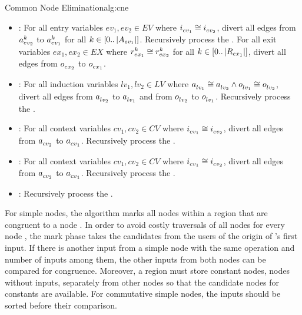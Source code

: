 \begin{informalg}{Common Node Elimination}{alg:cne}
\begin{enumerate}
\begin{itemize}
			\item \bpoint{\gammanode}: For all entry variables $ev_1, ev_2 \in EV$ where
				$\iput{}{ev_1} \cong \iput{}{ev_2}$, divert all edges from $\argument{k}{ev_2}$ to
				$\argument{k}{ev_1}$ for all $k \in [0..\card{A_{ev_1}}]$. Recursively
				process the \gammaregions. For all exit variables $ex_1, ex_2 \in EX$ where
				$\result{k}{ex_1} \cong \result{k}{ex_2}$ for all $k \in [0..\card{R_{ex_1}}]$, divert all
				edges from $\oput{}{ex_2}$ to $\oput{}{ex_1}$.

			\item \bpoint{\thetanode}: For all induction variables $lv_1, lv_2 \in LV$ where
				$\argument{}{lv_1} \cong \argument{}{lv_2} \land \oput{}{lv_1} \cong \oput{}{lv_2}$, divert
				all edges from $\argument{}{lv_2}$ to $\argument{}{lv_1}$ and from $\oput{}{lv_2}$ to
				$\oput{}{lv_1}$. Recursively process the \thetaregion.

			\item \bpoint{\lambdanode}: For all context variables $cv_1, cv_2 \in CV$ where
				$\iput{}{cv_1} \cong \iput{}{cv_2}$, divert all edges from $\argument{}{cv_2}$ to
				$\argument{}{cv_1}$. Recursively process the \lambdaregion.

			\item \bpoint{\phinode}: For all context variables $cv_1, cv_2 \in CV$ where
				$\iput{}{cv_1} \cong \iput{}{cv_2}$, divert all edges from $\argument{}{cv_2}$ to
				$\argument{}{cv_1}$. Recursively process the \phiregion.

			\item \bpoint{\omeganode}: Recursively process the \omegaregion.
		\end{itemize}

	\vspace*{-\baselineskip}
\end{enumerate}
\end{informalg}

For simple nodes, the algorithm marks all nodes within a
region that are congruent to a node \n. In order to avoid costly traversals of all nodes for every
node \n, the mark phase takes the candidates from the users of the origin of \n's first
input. If there is another input from a simple node \np with the same operation and number of
inputs among them, the other inputs from both nodes can be compared for congruence. Moreover, a
region must store constant nodes, \ie nodes without inputs, separately from other nodes so that the
candidate nodes for constants are available. For commutative simple nodes, the inputs should be
sorted before their comparison.

